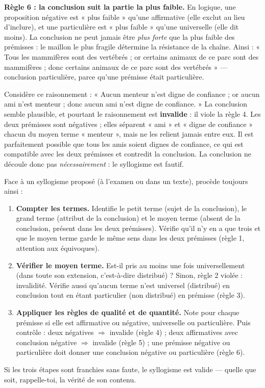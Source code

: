 \documentclass[11pt]{article}
\begin{document}
\textbf{Règle 6 : la conclusion suit la partie la plus faible.} En logique, une proposition négative est « plus faible » qu'une affirmative (elle exclut au lieu d'inclure), et une particulière est « plus faible » qu'une universelle (elle dit moins). La conclusion ne peut jamais être \emph{plus forte} que la plus faible des prémisses : le maillon le plus fragile détermine la résistance de la chaîne. Ainsi : « Tous les mammifères sont des vertébrés ; or certains animaux de ce parc sont des mammifères ; donc certains animaux de ce parc sont des vertébrés » — conclusion particulière, parce qu'une prémisse était particulière.

\begin{exemplebox}
Considère ce raisonnement : « Aucun menteur n'est digne de confiance ; or aucun ami n'est menteur ; donc aucun ami n'est digne de confiance. » La conclusion semble plausible, et pourtant le raisonnement est \textbf{invalide} : il viole la règle 4. Les deux prémisses sont négatives ; elles séparent « ami » et « digne de confiance » chacun du moyen terme « menteur », mais ne les relient jamais entre eux. Il est parfaitement possible que tous les amis soient dignes de confiance, ce qui est compatible avec les deux prémisses et contredit la conclusion. La conclusion ne découle donc pas \emph{nécessairement} : le syllogisme est fautif.
\end{exemplebox}

\begin{methode}
Face à un syllogisme proposé (à l'examen ou dans un texte), procède toujours ainsi :
\begin{enumerate}
\item \textbf{Compter les termes.} Identifie le petit terme (sujet de la conclusion), le grand terme (attribut de la conclusion) et le moyen terme (absent de la conclusion, présent dans les deux prémisses). Vérifie qu'il n'y en a que trois et que le moyen terme garde le même sens dans les deux prémisses (règle 1, attention aux équivoques).
\item \textbf{Vérifier le moyen terme.} Est-il pris au moins une fois universellement (dans toute son extension, c'est-à-dire distribué) ? Sinon, règle 2 violée : invalidité. Vérifie aussi qu'aucun terme n'est universel (distribué) en conclusion tout en étant particulier (non distribué) en prémisse (règle 3).
\item \textbf{Appliquer les règles de qualité et de quantité.} Note pour chaque prémisse si elle est affirmative ou négative, universelle ou particulière. Puis contrôle : deux négatives $\Rightarrow$ invalide (règle 4) ; deux affirmatives avec conclusion négative $\Rightarrow$ invalide (règle 5) ; une prémisse négative ou particulière doit donner une conclusion négative ou particulière (règle 6).
\end{enumerate}
Si les trois étapes sont franchies sans faute, le syllogisme est valide — quelle que soit, rappelle-toi, la vérité de son contenu.
\end{methode}
\end{document}

